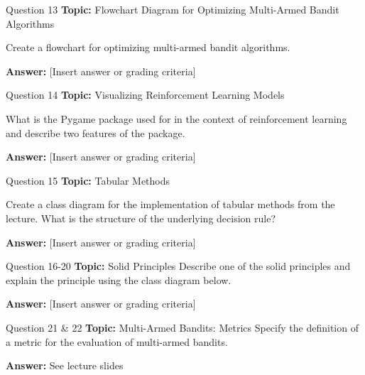 \begin{frame}{Question 13}
    \textbf{Topic:} Flowchart Diagram for Optimizing Multi-Armed Bandit Algorithms
    \vspace{10pt}

    Create a flowchart for optimizing multi-armed bandit algorithms. 
    \vspace{20pt}

    \textbf{Answer:} [Insert answer or grading criteria]
\end{frame}

\begin{frame}{Question 14}
    \textbf{Topic:} Visualizing Reinforcement Learning Models
    \vspace{10pt}

    What is the Pygame package used for in the context of reinforcement learning and describe two features of the package. 
    \vspace{20pt}

    \textbf{Answer:} [Insert answer or grading criteria]
\end{frame}

\begin{frame}{Question 15}
    \textbf{Topic:} Tabular Methods
    \vspace{10pt}

    Create a class diagram for the implementation of tabular methods from the lecture. What is the structure of the underlying decision rule? 
    \vspace{20pt}

    \textbf{Answer:} [Insert answer or grading criteria]
\end{frame}

\begin{frame}{Question 16-20}
    \textbf{Topic:} Solid Principles
    \vspace{10pt}
    Describe one of the solid principles and explain the principle using the class diagram below. 
    \vspace{20pt}

    \textbf{Answer:} [Insert answer or grading criteria]
\end{frame}

\begin{frame}{Question 21 \& 22}
    \textbf{Topic:} Multi-Armed Bandits: Metrics
    \vspace{10pt}
    Specify the definition of a metric for the evaluation of multi-armed bandits.
    \vspace{20pt}

    \textbf{Answer:} See lecture slides
\end{frame}

